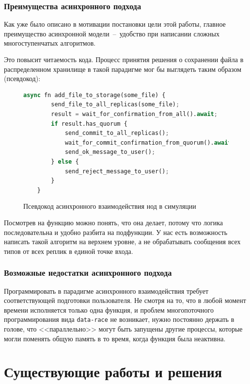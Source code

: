 \subsubsection{Преимущества асинхронного подхода}

Как уже было описано в мотивации постановки цели этой работы, главное преимущество асинхронной модели~--~удобство при написании сложных многоступенчатых алгоритмов.

Это повысит читаемость кода. Процесс принятия решения о сохранении файла в распределенном хранилище в такой парадигме мог бы выглядеть таким образом (псевдокод):

\begin{figure}[H]
\begin{lstlisting}[language=Python]
    async fn add_file_to_storage(some_file) {
        send_file_to_all_replicas(some_file);
        result = wait_for_confirmation_from_all().await;
        if result.has_quorum {
            send_commit_to_all_replicas();
            wait_for_commit_confirmation_from_quorum().await;
            send_ok_message_to_user();
        } else {
            send_reject_message_to_user();
        }
    }
\end{lstlisting}
\caption{Псевдокод асинхронного взаимодействия нод в симуляции}
\label{pseudocode}
\end{figure}

Посмотрев на функцию можно понять, что она делает, потому что логика последовательна и удобно разбита на подфункции. У нас есть возможность написать такой алгоритм на верхнем уровне, а не обрабатывать сообщения всех типов от всех реплик в единой точке входа.

\subsubsection{Возможные недостатки асинхронного подхода}

Программировать в парадигме асинхронного взаимодействия требует соответствующей подготовки пользователя. Не смотря на то, что в любой момент времени исполняется только одна функция, и проблем многопоточного программирования вида \texttt{data-race} не возникает, нужно постоянно держать в голове, что <<параллельно>> могут быть запущены другие процессы, которые могли поменять общую память в то время, когда функция была неактивна. 

\newpage 

\section{Существующие работы и решения}

